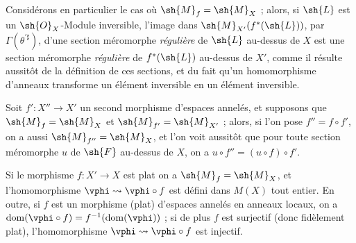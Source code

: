 \begin{env}[20.1.11]
Considérons en particulier le cas où $\sh{M}_f=\sh{M}_X$ ; alors, si $\sh{L}$ est un $\sh{O}_X$-Module inversible, l'image dans $\sh{M}_{X'}(f^*(\sh{L}))$, par $\Gamma(\theta^{\prime\sharp})$, d'une section méromorphe \emph{régulière} de $\sh{L}$ au-dessus de $X$  est une section méromorphe \emph{régulière} de $f^*(\sh{L})$ au-dessus de $X'$, comme il résulte aussitôt de la définition de ces sections, et du fait qu'un homomorphisme d'anneaux transforme un élément inversible en un élément inversible.

Soit $f':X''\to X'$ un second morphisme d'espaces annelés, et supposons que $\sh{M}_f=\sh{M}_X$ et $\sh{M}_{f'}=\sh{M}_{X'}$ ; alors, si l'on pose $f''=f\circ f'$, on a aussi $\sh{M}_{f''}=\sh{M}_X$, et l'on voit aussitôt que pour toute section méromorphe $u$ de $\sh{F}$ au-dessus de $X$, on a $u\circ f''=(u\circ f)\circ f'$.
\end{env}

\begin{proposition}[20.1.12]
\label{IV.20.1.12}
Si le morphisme $f:X'\to X$ est plat  on a $\sh{M}_f=\sh{M}_X$, et l'homomorphisme $\vphi\leadsto\vphi\circ f$ est défini dans $M(X)$ tout entier.
En outre, si $f$ est un morphisme (plat) d'espaces annelés en anneaux locaux, on a $\operatorname{dom}(\vphi\circ f)=f^{-1}(\operatorname{dom}(\vphi))$ ; si de plus $f$ est surjectif (donc fidèlement plat), l'homomorphisme $\vphi\leadsto\vphi\circ f$ est injectif.
\end{proposition}

